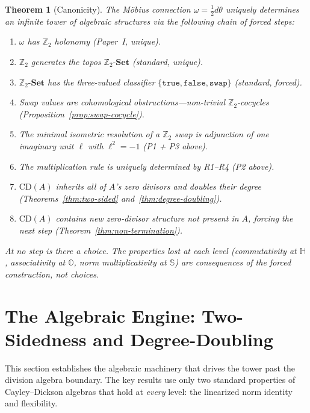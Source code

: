 \documentclass[12pt,a4paper]{article}
\newtheorem{theorem}{Theorem}[section]
\theoremstyle{definition}
\theoremstyle{remark}
\newcommand{\Z}{\mathbb{Z}}
\newcommand{\HH}{\mathbb{H}}
\newcommand{\OO}{\mathbb{O}}
\newcommand{\Sed}{\mathbb{S}}
\newcommand{\ZSet}{\Z_2\text{-}\mathbf{Set}}
\newcommand{\CD}{\mathrm{CD}}
\newcommand{\swap}{\mathtt{swap}}
\begin{document}
\begin{theorem}[Canonicity]
\label{thm:canonicity}
The M\"{o}bius connection $\omega = \tfrac{1}{2}d\theta$ uniquely
determines an infinite tower of algebraic structures via the
following chain of forced steps:
\begin{enumerate}[label=(C\arabic*), nosep]
  \item $\omega$ has $\Z_2$ holonomy \emph{(Paper~I, unique)}.
  \item $\Z_2$ generates the topos $\ZSet$
  \emph{(standard, unique)}.
  \item $\ZSet$ has the three-valued classifier
  $\{\mathtt{true}, \mathtt{false}, \swap\}$
  \emph{(standard, forced)}.
  \item Swap values are cohomological obstructions---non-trivial
  $\Z_2$-cocycles
  \emph{(Proposition~\ref{prop:swap-cocycle})}.
  \item The minimal isometric resolution of a $\Z_2$ swap is
  adjunction of one imaginary unit $\ell$ with $\ell^2 = -1$
  \emph{(P1 + P3 above)}.
  \item The multiplication rule is uniquely determined by
  R1--R4 \emph{(P2 above)}.
  \item $\CD(A)$ inherits all of $A$'s zero divisors and
  doubles their degree
  \emph{(Theorems~\ref{thm:two-sided}
  and~\ref{thm:degree-doubling})}.
  \item $\CD(A)$ contains new zero-divisor structure not
  present in $A$, forcing the next step
  \emph{(Theorem~\ref{thm:non-termination})}.
\end{enumerate}
At no step is there a choice. The properties lost at each level
(commutativity at $\HH$, associativity at $\OO$, norm
multiplicativity at $\Sed$) are consequences of the forced
construction, not choices.
\end{theorem}


\section{The Algebraic Engine: Two-Sidedness and Degree-Doubling}
\label{sec:engine}

This section establishes the algebraic machinery that drives the
tower past the division algebra boundary. The key results use only
two standard properties of Cayley--Dickson algebras that hold at
\emph{every} level: the linearized norm identity and flexibility.
\end{document}
